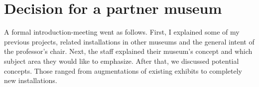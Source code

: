 
%


\section{Decision for a partner museum}
\label{partnering_decision}

A formal introduction-meeting went as follows. First, I explained some of my previous projects, related installations in other museums and the general intent of the professor's chair. Next, the staff explained their museum's concept and which subject area they would like to emphasize. After that, we discussed potential concepts. Those ranged from augmentations of existing exhibits to completely new installations.

